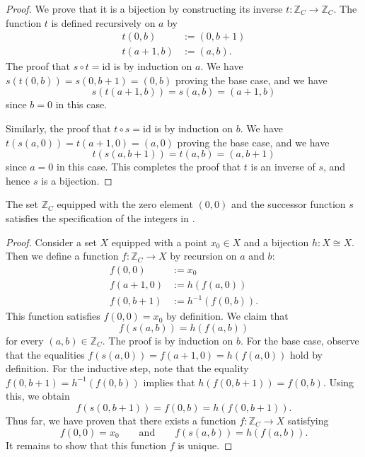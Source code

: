\begin{proof}
  We prove that it is a bijection by constructing its inverse $t:\mathbb{Z}_C\to \mathbb{Z}_C$. The function $t$ is defined recursively on $a$ by
  \begin{align*}
    t(0,b) & := (0,b+1) \\
    t(a+1,b) & := (a,b).
  \end{align*}
  The proof that $s\circ t=\mathrm{id}$ is by induction on $a$. We have $s(t(0,b))=s(0,b+1)=(0,b)$ proving the base case, and we have
  \begin{equation*}
    s(t(a+1,b))=s(a,b)=(a+1,b)
  \end{equation*}
  since $b=0$ in this case.

  Similarly, the proof that $t\circ s=\mathrm{id}$ is by induction on $b$. We have $t(s(a,0))=t(a+1,0)=(a,0)$ proving the base case, and we have
  \begin{equation*}
    t(s(a,b+1))=t(a,b)=(a,b+1)
  \end{equation*}
  since $a=0$ in this case. This completes the proof that $t$ is an inverse of $s$, and hence $s$ is a bijection.
\end{proof}

\begin{theorem}
  The set $\mathbb{Z}_C$ equipped with the zero element $(0,0)$ and the successor function $s$ satisfies the specification of the integers in .
\end{theorem}

\begin{proof}
  Consider a set $X$ equipped with a point $x_0\in X$ and a bijection $h:X\cong X$. Then we define a function $f:\mathbb{Z}_C\to X$ by recursion on $a$ and $b$:
  \begin{align*}
    f(0,0) & := x_0 \\
    f(a+1,0) & := h(f(a,0)) \\
    f(0,b+1) & := h^{-1}(f(0,b)).
  \end{align*}
  This function satisfies $f(0,0)=x_0$ by definition. We claim that
  \begin{equation*}
    f(s(a,b))=h(f(a,b))
  \end{equation*}
  for every $(a,b)\in \mathbb{Z}_C$. The proof is by induction on $b$. For the base case, observe that the equalities $f(s(a,0))=f(a+1,0)=h(f(a,0))$ hold by definition. For the inductive step, note that the equality $f(0,b+1)=h^{-1}(f(0,b))$ implies that $h(f(0,b+1))=f(0,b)$. Using this, we obtain
  \begin{equation*}
    f(s(0,b+1))=f(0,b)=h(f(0,b+1)).
  \end{equation*}
  Thus far, we have proven that there exists a function $f:\mathbb{Z}_C\to X$ satisfying
  \begin{equation*}
    f(0,0)=x_0\qquad\text{and}\qquad f(s(a,b))=h(f(a,b)).
  \end{equation*}
  It remains to show that this function $f$ is unique.
\end{proof}

